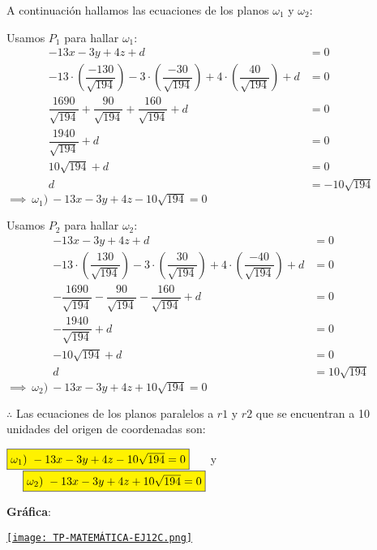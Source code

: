 \vspace{1cm}
\noindent A continuación hallamos las ecuaciones de los planos $\omega_1$ y $\omega_2$:

\noindent Usamos $P_1$ para hallar $\omega_1$:
\begin{align*}
	-13x - 3y + 4z + d                                 & = 0                     \\
	-13 \cdot \left( \dfrac{-130}{\sqrt{194}}\right)
	- 3 \cdot \left( \dfrac{-30}{\sqrt{194}}\right)
	+ 4 \cdot \left( \dfrac{40}{\sqrt{194}}\right) + d & = 0                     \\
	\dfrac{1690}{\sqrt{194}} + \dfrac{90}{\sqrt{194}}
	+ \dfrac{160}{\sqrt{194}} + d                      & = 0                     \\
	\dfrac{1940}{\sqrt{194}} + d                       & = 0                     \\
	10\sqrt{194} + d                                   & = 0                     \\
	d                                                  & = \boxed{-10\sqrt{194}}
\end{align*}
$\implies \ \omega_1) \ -13x - 3y + 4z -10\sqrt{194} = 0$

\noindent Usamos $P_2$ para hallar $\omega_2$:
\begin{align*}
	-13x - 3y + 4z + d                                  & = 0                    \\
	-13 \cdot \left( \dfrac{130}{\sqrt{194}}\right)
	- 3 \cdot \left( \dfrac{30}{\sqrt{194}}\right)
	+ 4 \cdot \left( \dfrac{-40}{\sqrt{194}}\right) + d & = 0                    \\
	- \dfrac{1690}{\sqrt{194}} - \dfrac{90}{\sqrt{194}}
	- \dfrac{160}{\sqrt{194}} + d                       & = 0                    \\
	- \dfrac{1940}{\sqrt{194}} + d                      & = 0                    \\
	- 10\sqrt{194} + d                                  & = 0                    \\
	d                                                   & = \boxed{10\sqrt{194}}
\end{align*}
$\implies \ \omega_2) \ -13x - 3y + 4z + 10\sqrt{194} = 0$

\vspace{1cm}
\noindent $\therefore$ Las ecuaciones de los planos paralelos a $r1$ y $r2$ que se encuentran a 10 unidades del origen de coordenadas son:

\begin{center}
	$\fcolorbox{black}{yellow}{$\omega_1) \ -13x - 3y + 4z -10\sqrt{194} = 0$} \hspace*{0.5cm}$ y
	$\hspace*{0.5cm} \fcolorbox{black}{yellow}{$\omega_2) \ -13x - 3y + 4z + 10\sqrt{194} = 0$}$
\end{center}

\vspace{2cm}
\noindent \textbf{Gráfica}:
\begin{center}
	\href{https://www.geogebra.org/3d/fmkxhwqc}{\texttt{[image: TP-MATEMÁTICA-EJ12C.png]}}
\end{center}
